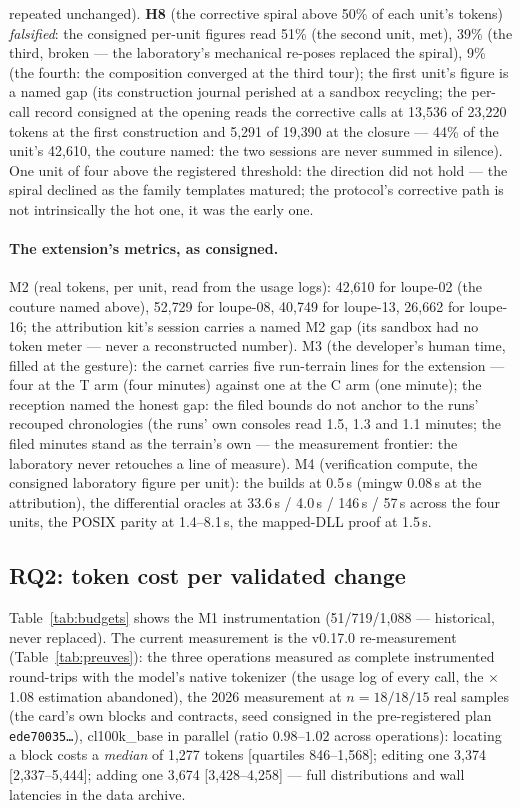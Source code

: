 \documentclass[10pt,a4paper]{article}
\newcommand{\code}[1]{\texttt{\small #1}}
\begin{document}
repeated unchanged). \textbf{H8} (the
corrective spiral above 50\% of each unit's tokens) \emph{falsified}:
the consigned per-unit figures read 51\% (the second unit, met),
39\% (the third, broken --- the laboratory's mechanical re-poses
replaced the spiral), 9\% (the fourth: the composition converged at
the third tour); the first unit's figure is a named gap (its
construction journal perished at a sandbox recycling; the per-call
record consigned at the opening reads the corrective calls at
13{,}536 of 23{,}220 tokens at the first construction and 5{,}291 of
19{,}390 at the closure --- 44\% of the unit's 42{,}610, the couture
named: the two sessions are never summed in silence). One unit of
four above the registered threshold: the direction did not hold ---
the spiral declined as the family templates matured; the protocol's
corrective path is not intrinsically the hot one, it was the early
one.

\paragraph{The extension's metrics, as consigned.} M2 (real tokens,
per unit, read from the usage logs): 42{,}610 for loupe-02 (the
couture named above), 52{,}729 for loupe-08, 40{,}749 for loupe-13,
26{,}662 for loupe-16; the attribution kit's session carries a named
M2 gap (its sandbox had no token meter --- never a reconstructed
number). M3 (the developer's human time, filled at the gesture): the
carnet carries five run-terrain lines for the extension --- four at
the T arm (four minutes) against one at the C arm (one minute); the
reception named the honest gap: the filed bounds do not anchor to the
runs' recouped chronologies (the runs' own consoles read 1.5, 1.3 and
1.1 minutes; the filed minutes stand as the terrain's own --- the
measurement frontier: the laboratory never retouches a line of
measure). M4 (verification compute, the consigned laboratory figure
per unit): the builds at 0.5\,s (mingw 0.08\,s at the attribution),
the differential oracles at 33.6\,s / 4.0\,s / 146\,s / 57\,s
across the four units, the POSIX parity at 1.4--8.1\,s, the
mapped-DLL proof at 1.5\,s.



\subsection{RQ2: token cost per validated change}\label{sec:rq2}

Table~\ref{tab:budgets} shows the M1 instrumentation (51/719/1{,}088 ---
historical, never replaced). The current measurement is the v0.17.0
re-measurement (Table~\ref{tab:preuves}): the three operations measured
as complete instrumented round-trips with the model's native tokenizer
(the usage log of every call, the $\times$1.08 estimation abandoned),
the 2026 measurement at $n{=}18/18/15$ real samples (the card's own
blocks and contracts, seed consigned in the pre-registered plan
\code{ede70035\ldots}),
cl100k\_base in parallel (ratio $0.98$--$1.02$ across operations):
locating a block costs a \emph{median} of 1{,}277 tokens [quartiles
846--1{,}568]; editing one 3{,}374 [2{,}337--5{,}444]; adding one 3{,}674
[3{,}428--4{,}258] --- full distributions and wall latencies in the data
archive.
\end{document}
